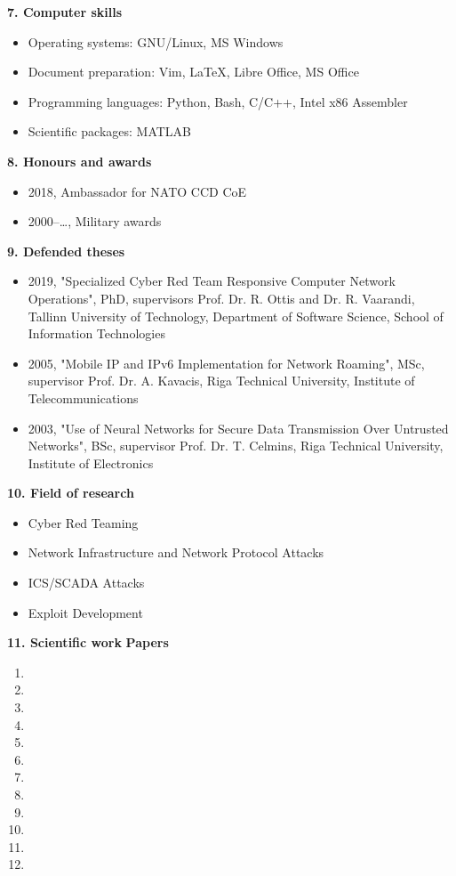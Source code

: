 \newpage
\textbf{7. Computer skills}
\begin{itemize}
\item Operating systems: GNU/Linux, MS Windows
\item Document preparation: Vim, LaTeX, Libre Office, MS Office
\item Programming languages: Python, Bash, C/C++, Intel x86 Assembler
\item Scientific packages: MATLAB
\end{itemize}

\textbf{8. Honours and awards}
\begin{itemize}
\item 2018, Ambassador for NATO CCD CoE
\item 2000--\ldots, Military awards
\end{itemize}   

\textbf{9. Defended theses} 
\begin{itemize}
\item 2019, "Specialized Cyber Red Team Responsive Computer Network Operations", PhD, supervisors Prof. Dr. R. Ottis and Dr. R. Vaarandi, Tallinn University of Technology, Department of Software Science, School of Information Technologies
\item 2005, "Mobile IP and IPv6 Implementation for Network Roaming", MSc, supervisor Prof. Dr. A. Kavacis, Riga Technical University, Institute of Telecommunications
\item 2003, "Use of Neural Networks for Secure Data Transmission Over Untrusted Networks", BSc, supervisor Prof. Dr. T. Celmins, Riga Technical University, Institute of Electronics
\end{itemize}

\textbf{10. Field of research} 
\begin{itemize}
\item Cyber Red Teaming
\item Network Infrastructure and Network Protocol Attacks
\item ICS/SCADA Attacks
\item Exploit Development
\end{itemize}

\textbf{11. Scientific work}
\textbf{Papers}
\begin{enumerate}
\item \bibentry{\FirstArticle}
\item \bibentry{\SecondArticle}
\item \bibentry{\ThirdArticle}
\item \bibentry{\FourthArticle}
\item \bibentry{\FifthArticle}
\item \bibentry{\SixthArticle}
\item \bibentry{\SeventhArticle}
\item \bibentry{\EighthArticle}
\item \bibentry{\NinthArticle}
\item \bibentry{\TenthArticle}
\item \bibentry{\unrelatedpublicationone}
\item \bibentry{\unrelatedpublicationtwo}
\end{enumerate}

